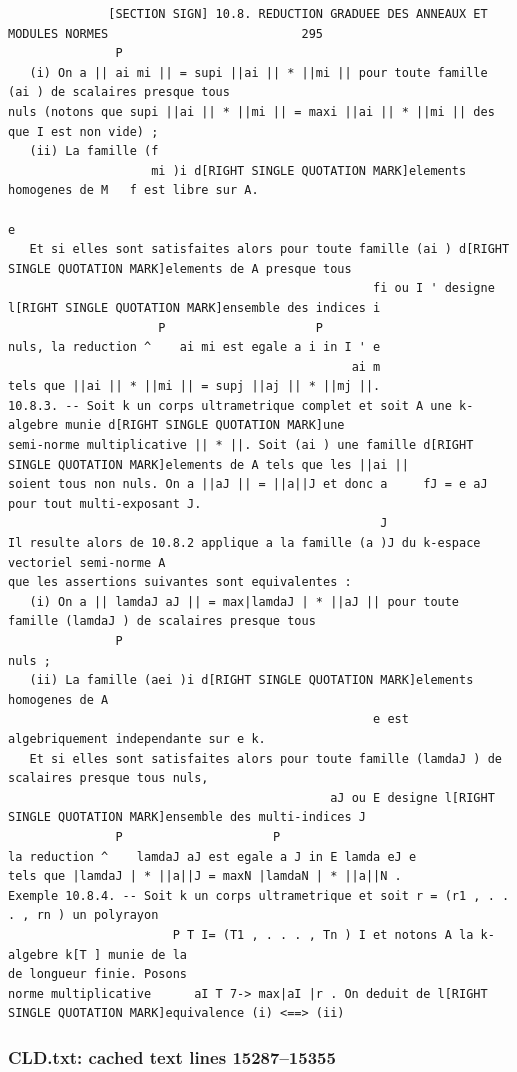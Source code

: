 \documentclass[
  11pt,
]{article}
\begin{document}
\begin{lstlisting}
              [SECTION SIGN] 10.8. REDUCTION GRADUEE DES ANNEAUX ET MODULES NORMES                           295
               P
   (i) On a || ai mi || = supi ||ai || * ||mi || pour toute famille (ai ) de scalaires presque tous
nuls (notons que supi ||ai || * ||mi || = maxi ||ai || * ||mi || des que I est non vide) ;
   (ii) La famille (f
                    mi )i d[RIGHT SINGLE QUOTATION MARK]elements homogenes de M   f est libre sur A.
                                                                       e
   Et si elles sont satisfaites alors pour toute famille (ai ) d[RIGHT SINGLE QUOTATION MARK]elements de A presque tous
                                                   fi ou I ' designe l[RIGHT SINGLE QUOTATION MARK]ensemble des indices i
                     P                     P
nuls, la reduction ^    ai mi est egale a i in I ' e
                                                ai m
tels que ||ai || * ||mi || = supj ||aj || * ||mj ||.
10.8.3. -- Soit k un corps ultrametrique complet et soit A une k-algebre munie d[RIGHT SINGLE QUOTATION MARK]une
semi-norme multiplicative || * ||. Soit (ai ) une famille d[RIGHT SINGLE QUOTATION MARK]elements de A tels que les ||ai ||
soient tous non nuls. On a ||aJ || = ||a||J et donc a     fJ = e aJ pour tout multi-exposant J.
                                                    J
Il resulte alors de 10.8.2 applique a la famille (a )J du k-espace vectoriel semi-norme A
que les assertions suivantes sont equivalentes :
   (i) On a || lamdaJ aJ || = max|lamdaJ | * ||aJ || pour toute famille (lamdaJ ) de scalaires presque tous
               P
nuls ;
   (ii) La famille (aei )i d[RIGHT SINGLE QUOTATION MARK]elements homogenes de A
                                                   e est algebriquement independante sur e k.
   Et si elles sont satisfaites alors pour toute famille (lamdaJ ) de scalaires presque tous nuls,
                                             aJ ou E designe l[RIGHT SINGLE QUOTATION MARK]ensemble des multi-indices J
               P                     P
la reduction ^    lamdaJ aJ est egale a J in E lamda eJ e
tels que |lamdaJ | * ||a||J = maxN |lamdaN | * ||a||N .
Exemple 10.8.4. -- Soit k un corps ultrametrique et soit r = (r1 , . . . , rn ) un polyrayon
                       P T I= (T1 , . . . , Tn ) I et notons A la k-algebre k[T ] munie de la
de longueur finie. Posons
norme multiplicative      aI T 7-> max|aI |r . On deduit de l[RIGHT SINGLE QUOTATION MARK]equivalence (i) <==> (ii)
\end{lstlisting}

\subsubsection{CLD.txt: cached text lines
15287--15355}\label{cld.txt-cached-text-lines-1528715355}
\end{document}
